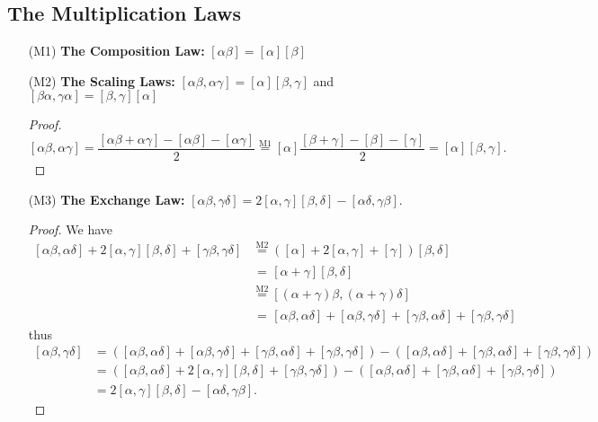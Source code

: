 \documentclass[10pt]{amsart}
\newcommand{\norm}[1]{\left[#1\right]}
\begin{document}
\subsection{The Multiplication Laws}
\begin{enumerate}
\item[(M1)] \textbf{The Composition Law:}
$
\norm{\alpha \beta} = \norm{\alpha}\norm{\beta}
$

\item[(M2)] \textbf{The Scaling Laws:}
$
\norm{\alpha\beta, \alpha \gamma} = \norm{\alpha}\norm{\beta,\gamma}
$
and
$
\norm{\beta\alpha, \gamma\alpha} = \norm{\beta,\gamma}\norm{\alpha}
$

\begin{proof}
$
\norm{\alpha \beta, \alpha \gamma}
=
\dfrac{\norm{\alpha\beta + \alpha \gamma} - \norm{\alpha\beta} - \norm{\alpha \gamma}}{2}
\overset{\text{M}1}{=}
\norm{\alpha}\dfrac{\norm{\beta + \gamma} - \norm{\beta} - \norm{\gamma}}{2} = \norm{\alpha}\norm{\beta,\gamma}.
$
\end{proof}

\item[(M3)] \textbf{The Exchange Law:}
$ \norm{\alpha \beta, \gamma \delta} = 2 \norm{\alpha, \gamma}\norm{\beta, \delta} - \norm{\alpha \delta, \gamma \beta}$.

\begin{proof}
We have
\begin{align*}
\norm{\alpha \beta, \alpha \delta} + 2\norm{\alpha, \gamma}\norm{\beta,\delta} + \norm{\gamma\beta, \gamma \delta}
&\overset{\text{M}2}{=}
(\norm{\alpha} + 2\norm{\alpha,\gamma} + \norm{\gamma})\norm{\beta,\delta}
\\
&\overset{\phantom{\text{M}2}}{=}
\norm{\alpha + \gamma}\norm{\beta,\delta}
\\
&\overset{\text{M}2}{=} \norm{(\alpha + \gamma)\beta, (\alpha + \gamma)\delta}
\\
&\overset{\phantom{\text{M}2}}{=}
\norm{\alpha\beta, \alpha\delta} + \norm{\alpha \beta, \gamma \delta} + \norm{\gamma\beta,\alpha\delta} + \norm{\gamma\beta, \gamma\delta}
\end{align*}
thus
\begin{align*}
\norm{\alpha \beta, \gamma \delta}
&=
(\norm{\alpha\beta, \alpha\delta} + \norm{\alpha \beta, \gamma \delta} + \norm{\gamma\beta,\alpha\delta} + \norm{\gamma\beta, \gamma\delta})
-
(\norm{\alpha\beta, \alpha\delta} + \norm{\gamma\beta,\alpha\delta} + \norm{\gamma\beta, \gamma\delta})
\\
&=
(\norm{\alpha \beta, \alpha \delta} + 2\norm{\alpha, \gamma}\norm{\beta,\delta} + \norm{\gamma\beta, \gamma \delta})
-
(\norm{\alpha\beta, \alpha\delta} + \norm{\gamma\beta,\alpha\delta} + \norm{\gamma\beta, \gamma\delta})
\\
&=
2\norm{\alpha, \gamma}\norm{\beta,\delta}
-
\norm{\alpha\delta,\gamma\beta}.
\end{align*}

\end{proof}

\end{enumerate}
\end{document}
